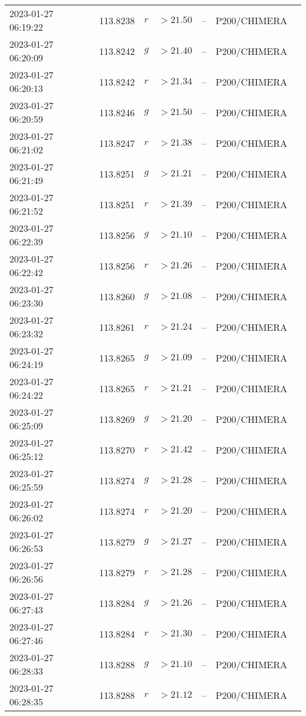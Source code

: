 \documentclass{nature_plusfigure}
\begin{document}
\begin{supplement}
\begin{center}
\begin{longtable}{lllllll}
2023-01-27 06:19:22 & 113.8238 & $r$ & $>21.50$ & -- & P200/CHIMERA &  \\ 
2023-01-27 06:20:09 & 113.8242 & $g$ & $>21.40$ & -- & P200/CHIMERA &  \\ 
2023-01-27 06:20:13 & 113.8242 & $r$ & $>21.34$ & -- & P200/CHIMERA &  \\ 
2023-01-27 06:20:59 & 113.8246 & $g$ & $>21.50$ & -- & P200/CHIMERA &  \\ 
2023-01-27 06:21:02 & 113.8247 & $r$ & $>21.38$ & -- & P200/CHIMERA &  \\ 
2023-01-27 06:21:49 & 113.8251 & $g$ & $>21.21$ & -- & P200/CHIMERA &  \\ 
2023-01-27 06:21:52 & 113.8251 & $r$ & $>21.39$ & -- & P200/CHIMERA &  \\ 
2023-01-27 06:22:39 & 113.8256 & $g$ & $>21.10$ & -- & P200/CHIMERA &  \\ 
2023-01-27 06:22:42 & 113.8256 & $r$ & $>21.26$ & -- & P200/CHIMERA &  \\ 
2023-01-27 06:23:30 & 113.8260 & $g$ & $>21.08$ & -- & P200/CHIMERA &  \\ 
2023-01-27 06:23:32 & 113.8261 & $r$ & $>21.24$ & -- & P200/CHIMERA &  \\ 
2023-01-27 06:24:19 & 113.8265 & $g$ & $>21.09$ & -- & P200/CHIMERA &  \\ 
2023-01-27 06:24:22 & 113.8265 & $r$ & $>21.21$ & -- & P200/CHIMERA &  \\ 
2023-01-27 06:25:09 & 113.8269 & $g$ & $>21.20$ & -- & P200/CHIMERA &  \\ 
2023-01-27 06:25:12 & 113.8270 & $r$ & $>21.42$ & -- & P200/CHIMERA &  \\ 
2023-01-27 06:25:59 & 113.8274 & $g$ & $>21.28$ & -- & P200/CHIMERA &  \\ 
2023-01-27 06:26:02 & 113.8274 & $r$ & $>21.20$ & -- & P200/CHIMERA &  \\ 
2023-01-27 06:26:53 & 113.8279 & $g$ & $>21.27$ & -- & P200/CHIMERA &  \\ 
2023-01-27 06:26:56 & 113.8279 & $r$ & $>21.28$ & -- & P200/CHIMERA &  \\ 
2023-01-27 06:27:43 & 113.8284 & $g$ & $>21.26$ & -- & P200/CHIMERA &  \\ 
2023-01-27 06:27:46 & 113.8284 & $r$ & $>21.30$ & -- & P200/CHIMERA &  \\ 
2023-01-27 06:28:33 & 113.8288 & $g$ & $>21.10$ & -- & P200/CHIMERA &  \\ 
2023-01-27 06:28:35 & 113.8288 & $r$ & $>21.12$ & -- & P200/CHIMERA &  \\ 

\end{longtable}
\end{center}
\end{supplement}
\end{document}
